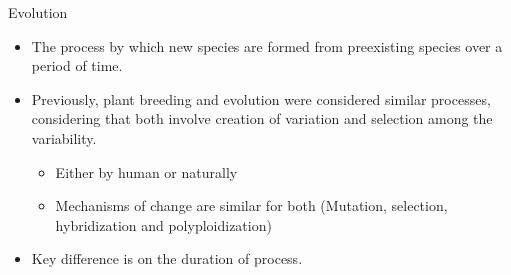 \documentclass[11pt,ignorenonframetext,aspectratio=169]{beamer}
\providecommand{\tightlist}{%
  \setlength{\itemsep}{0pt}\setlength{\parskip}{0pt}}
\begin{document}
\begin{frame}{Evolution}
\protect\hypertarget{evolution}{}
\begin{itemize}
\tightlist
\item
  The process by which new species are formed from preexisting species
  over a period of time.
\item
  Previously, plant breeding and evolution were considered similar
  processes, considering that both involve creation of variation and
  selection among the variability.

  \begin{itemize}
  \tightlist
  \item
    Either by human or naturally
  \item
    Mechanisms of change are similar for both (Mutation, selection,
    hybridization and polyploidization)
  \end{itemize}
\item
  Key difference is on the duration of process.
\end{itemize}
\end{frame}
\end{document}
